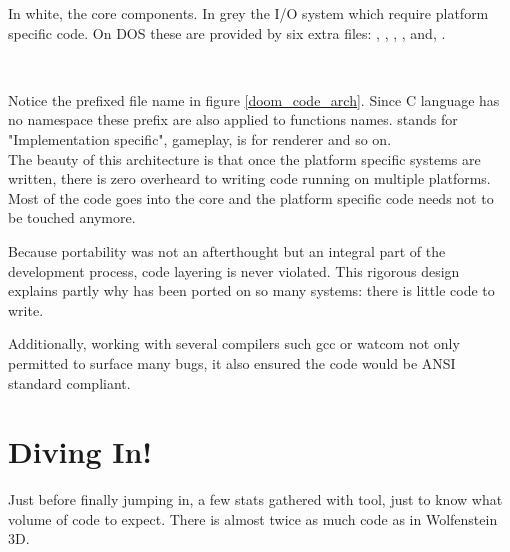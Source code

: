 \pagebreak
{}
\par
In white, the core components. In grey the I/O system which require platform specific code. On DOS these are provided by six extra files: , , , ,  and, .\\









\vspace{-4mm}
\\
\par
Notice the prefixed file name in figure \ref{doom_code_arch}. Since C language has no namespace these prefix are also applied to functions names.  stands for "Implementation specific",  gameplay,  is for renderer and so on.\\

The beauty of this architecture is that once the platform specific systems are written, there is zero overheard to writing code running on multiple platforms. Most of the code goes into the core and the platform specific code needs not to be touched anymore.\\
\par
Because portability was not an afterthought but an integral part of the development process, \doom{} code layering is never violated. This rigorous design explains partly why \doom{} has been ported on so many systems: there is little code to write.\\
\par 
Additionally, working with several compilers such gcc or watcom not only permitted to surface many bugs, it also ensured the code would be ANSI standard compliant.\\
\vspace{-10pt}
\section{Diving In!}
Just before finally jumping in, a few stats gathered with  tool, just to know what volume of code to expect. There is almost twice as much code as in Wolfenstein 3D.\\
\par
{}
\par

